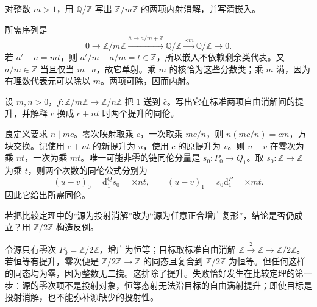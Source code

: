 \begin{exercise}\label{b4:ex:07-cyclic-injective-resolution}
	对整数 \(m>1\)，用 \(\mathbb Q/\mathbb Z\) 写出 \(\mathbb Z/m\mathbb Z\) 的两项内射消解，并写清嵌入。
\end{exercise}
\begin{solution}
	所需序列是
	\[
		0\longrightarrow\mathbb Z/m\mathbb Z \xrightarrow{\bar a\mapsto a/m+\mathbb Z}\mathbb Q/\mathbb Z \xrightarrow{\times m}\mathbb Q/\mathbb Z\longrightarrow0.
	\]
	若 \(a'-a=mt\)，则 \(a'/m-a/m=t\in\mathbb Z\)，所以嵌入不依赖剩余类代表。又 \(a/m\in\mathbb Z\) 当且仅当 \(m\mid a\)，故它单射。乘 \(m\) 的核恰为这些分数类；乘 \(m\) 满，因为有理数代表元可以除以 \(m\)。两项可除，因而内射。
\end{solution}

\begin{exercise}\label{b4:ex:07-cyclic-comparison}
	设 \(m,n>0\)，\(f:\mathbb Z/m\mathbb Z\to\mathbb Z/n\mathbb Z\) 把 \(\bar1\) 送到 \(\bar c\)。写出它在标准两项自由消解间的提升，并解释 \(c\) 换成 \(c+nt\) 时两个提升的同伦。
\end{exercise}
\begin{solution}
	良定义要求 \(n\mid mc\)。零次映射取乘 \(c\)，一次取乘 \(mc/n\)，则 \(n(mc/n)=cm\)，方块交换。记使用 \(c+nt\) 的新提升为 \(u\)，使用 \(c\) 的原提升为 \(v\)。则 \(u-v\) 在零次为乘 \(nt\)，一次为乘 \(mt\)。唯一可能非零的链同伦分量是 \(s_0:P_0\to Q_1\)。取 \(s_0:\mathbb Z\to\mathbb Z\) 为乘 \(t\)，则两个次数的同伦公式分别为
	\[
		(u-v)_0=\mathrm{d}_1^Qs_0=\times nt, \qquad (u-v)_1=s_0\mathrm{d}_1^P=\times mt.
	\]
	因此它给出所需同伦。
\end{solution}

\begin{exercise}\label{b4:ex:07-projective-source-necessary}
	若把比较定理中的“源为投射消解”改为“源为任意正合增广复形”，结论是否仍成立？用 \(\mathbb Z/2\mathbb Z\) 构造反例。
\end{exercise}
\begin{solution}
	令源只有零次 \(P_0=\mathbb Z/2\mathbb Z\)，增广为恒等；目标取标准自由消解 \(\mathbb Z\xrightarrow2\mathbb Z\to\mathbb Z/2\mathbb Z\)。若恒等有提升，零次便是 \(\mathbb Z/2\mathbb Z\to\mathbb Z\) 的同态且复合到 \(\mathbb Z/2\mathbb Z\) 为恒等。但任何这样的同态均为零，因为整数无二挠。这排除了提升。失败恰好发生在比较定理的第一步：源的零次项不是投射对象，恒等态射无法沿目标的自由满射提升；即使目标是投射消解，也不能弥补源缺少的投射性。
\end{solution}

